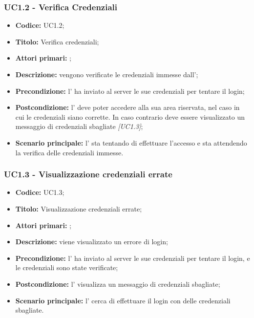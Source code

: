 \documentclass[casi-duso]{subfiles}
\begin{document}
\subsubsection{UC1.2 - Verifica Credenziali}
\label{subsub:UC1.2}

\begin{itemize}
  \item \textbf{Codice:} UC1.2;
  \item \textbf{Titolo:} Verifica credenziali;
  \item \textbf{Attori primari:} ;
  \item \textbf{Descrizione:} vengono verificate le credenziali immesse dall';
  \item \textbf{Precondizione:} l' ha inviato al server le sue credenziali per tentare il login;
  \item \textbf{Postcondizione:} l' deve poter accedere alla sua area riservata, nel caso in cui le credenziali siano corrette. In caso
        contrario deve essere visualizzato un messaggio di credenziali sbagliate \emph{[UC1.3]};
  \item \textbf{Scenario principale:} l' sta tentando di effettuare l'accesso e sta attendendo la verifica delle credenziali immesse.
\end{itemize}

\subsubsection{UC1.3 - Visualizzazione credenziali errate}
\label{subsub:UC1.3}

\begin{itemize}
  \item \textbf{Codice:} UC1.3;
  \item \textbf{Titolo:} Visualizzazione credenziali errate;
  \item \textbf{Attori primari:} ;
  \item \textbf{Descrizione:} viene visualizzato un errore di login;
  \item \textbf{Precondizione:} l' ha inviato al server le sue credenziali per tentare il login, e le credenziali sono state verificate;
  \item \textbf{Postcondizione:} l' visualizza un messaggio di credenziali sbagliate;
  \item \textbf{Scenario principale:} l' cerca di effettuare il login con delle credenziali sbagliate.
  

\end{itemize}
\end{document}

